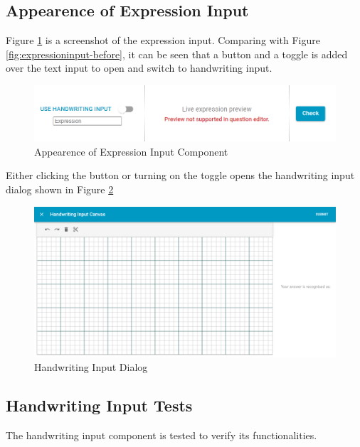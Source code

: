 \documentclass[12pt,twoside]{report}
\begin{document}
\subsection*{Appearence of Expression Input}
Figure \ref{fig:component-appearence} is a screenshot of the expression input.
Comparing with Figure \ref{fig:expressioninput-before}, it can be seen that a
button and a toggle is added over the text input to open and switch to
handwriting input.
\begin{figure}[h]
    \centering
    \includegraphics[width=\linewidth, frame]{figures/component-appearence.png}
    \caption{Appearence of Expression Input Component}
    \label{fig:component-appearence}
\end{figure}

Either clicking the button or turning on the toggle opens the handwriting input dialog shown in Figure \ref{fig:handwriting-plain}
\begin{figure}[h]
    \centering
    \includegraphics[width=\linewidth, frame]{figures/handwriting-dialog-plain.png}
    \caption{Handwriting Input Dialog}
    \label{fig:handwriting-plain}
\end{figure}

\subsection*{Handwriting Input Tests}
The handwriting input component is tested to verify its functionalities.
\end{document}
